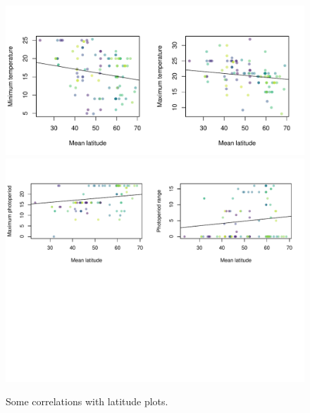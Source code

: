 \documentclass[11pt]{article}
\begin{document}
\begin{figure}[t!]
\centering
\includegraphics[width=1\textwidth]{..//..//analyses/limitingcues/figures/tempxlatminmaxcorr.pdf}
\includegraphics[width=1\textwidth]{..//..//analyses/limitingcues/figures/photoxlatcorr2plots.pdf}
\caption{Some correlations with latitude plots.}
  \label{fig:lat}
\end{figure}
\end{document}
